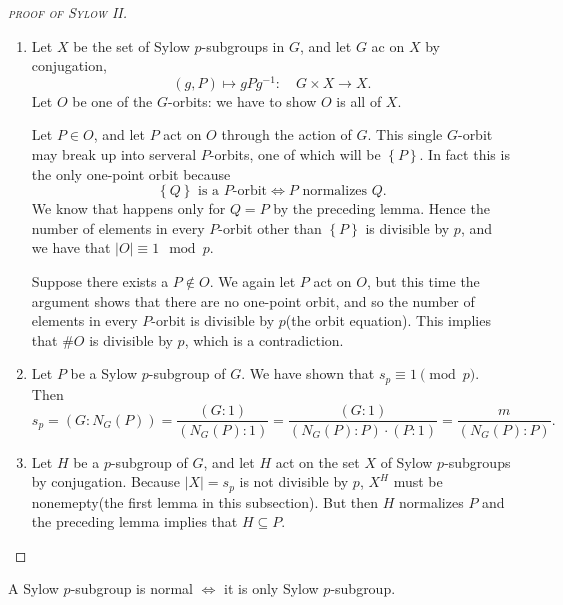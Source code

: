 \begin{proof}[\textsc{proof of Sylow II}]
  \begin{enumerate}
    \item Let \( X \) be the set of Sylow \( p \)-subgroups in \( G \), and let \( G \) ac on \( X \) by conjugation,
      \[
        (g, P) \mapsto g P g^{-1}: \quad G \times X \to X.
      \]
      Let \( O \) be one of the \( G \)-orbits: we have to show \( O \) is all of \( X \).

      Let \( P \in O \), and let \( P \) act on \( O \) through the action of \( G \).
      This single \( G \)-orbit may break up into serveral \( P \)-orbits, one of which will be \( \left\lbrace P \right\rbrace \).
      In fact this is the only one-point orbit because
      \[
        \left\lbrace Q \right\rbrace \text{ is a } P \text{-orbit} \iff P \text{ normalizes } Q.
      \]
      We know that happens only for \( Q = P \) by the preceding lemma.
      Hence the number of elements in every \( P \)-orbit other than \( \left\lbrace P \right\rbrace \) is divisible by \( p \), and we have that \( \left\vert O \right\vert \equiv 1 \mod{p} \).

      Suppose there exists a \( P \notin O \).
      We again let \( P \) act on \( O \), but this time the argument shows that there are no one-point orbit, and so the number of elements in every \( P \)-orbit is divisible by \( p \)(the orbit equation).
      This implies that \( \# O \) is divisible by \( p \), which is a contradiction.
    \item Let \( P \) be a Sylow \( p \)-subgroup of \( G \).
      We have shown that \( s_p \equiv 1 \pmod{p} \).
      Then
      \[
        s_p = (G : N_G(P)) = \frac{(G : 1)}{(N_G(P) : 1)} = \frac{(G : 1)}{(N_G(P): P) \cdot (P : 1)} = \frac{m}{(N_G(P): P)}.
      \]
    \item Let \( H \) be a \( p \)-subgroup of \( G \), and let \( H \) act on the set \( X \) of Sylow \( p \)-subgroups by conjugation.
      Because \( \left\vert X \right\vert = s_p \) is not divisible by \( p \), \( X^H \) must be nonemepty(the first lemma in this subsection).
      But then \( H \) normalizes \( P \) and the preceding lemma implies that \( H \subseteq P \).
  \end{enumerate}
\end{proof}

\begin{corollary}
  A Sylow \( p \)-subgroup is normal \( \iff \) it is only Sylow \( p \)-subgroup.
\end{corollary}

